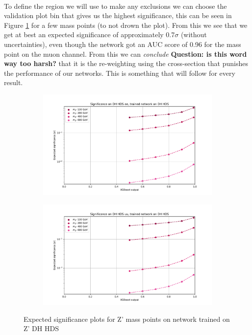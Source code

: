 \documentclass[12pt, a4paper]{book}
\begin{document}
\\To define the region we will use to make any exclusions we can choose the validation plot bin that gives us the highest significance, this can be seen in Figure \ref{fig:DH_HDS_exp_sig} for a few mass points (to not drown the plot). From this we see that we get at best an expected significance 
of approximately 0.7$\sigma$ (without uncertainties), even though the network got an AUC score of 0.96 for the mass point on the muon channel. From this we can \textit{conclude} \textbf{Question: is this word way too harsh?} that it is the re-weighting using the cross-section that punishes 
the performance of our networks. This is something that will follow for every result.\\
\begin{figure}[!ht]
	\centering
	\begin{subfigure}[b]{0.49\textwidth}
      \centering
      \includegraphics[width=1\textwidth]{XGBoost/DH_HDS/EXP_SIG_ee.pdf}
      \end{subfigure}
   \hfill
   \begin{subfigure}[b]{0.49\textwidth}
      \centering
      \includegraphics[width=1\textwidth]{XGBoost/DH_HDS/EXP_SIG_uu.pdf}
      \end{subfigure}
   \caption{Expected significance plots for Z' mass points on network trained on Z' DH HDS}\label{fig:DH_HDS_exp_sig}
\end{figure}
\end{document}
